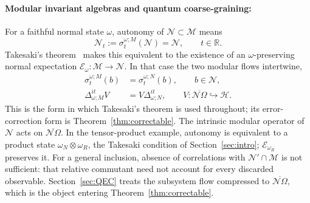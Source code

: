 \documentclass[a4paper,11pt]{article}
\theoremstyle{definition}
\newcommand{\nn}{\nonumber}
\newcommand{\mE}{\mathcal{E}}
\begin{document}
\paragraph{Modular invariant algebras and quantum coarse-graining:}
For a faithful normal state $\omega$, autonomy of $\mathcal N\subset\mathcal M$ means
\begin{equation}\label{eq:quantum-coarse-autonomy}
 \mathcal N_t:=\sigma^{\omega;M}_t(\mathcal N)=\mathcal N,\qquad t\in\mathbb R.
\end{equation}
Takesaki's theorem~\cite{Takesaki1972} makes this equivalent to the existence of
an $\omega$-preserving normal expectation $\mE_\omega:\mathcal M\to\mathcal N$. In that case the two modular flows intertwine,
\begin{align}
 \sigma^{\omega;M}_t(b)&=\sigma^{\omega;N}_t(b),\qquad b\in\mathcal N,\nn\\
 \Delta_{\omega;M}^{it}V&=V\Delta_{\omega;N}^{it},
 \qquad V:\overline{\mathcal N\Omega}\hookrightarrow\mathcal H.
 \label{eq:takesaki-intertwining}
\end{align}
This is the form in which Takesaki's theorem is used throughout; its error-correction form is Theorem~\ref{thm:correctable}.
The intrinsic modular operator of $\mathcal N$ acts on $\overline{\mathcal N\Omega}$.
In the tensor-product example, autonomy is equivalent to a product state
$\omega_N\otimes\omega_R$, the Takesaki condition of Section~\ref{sec:intro}; $\mE_{\omega_R}$ preserves it.
For a general inclusion, absence of correlations with $\mathcal N'\cap\mathcal M$ is not sufficient:
that relative commutant need not account for every discarded observable.
Section~\ref{sec:QEC} treats the subsystem flow compressed to
$\overline{\mathcal N\Omega}$, which is the object entering Theorem~\ref{thm:correctable}.

\end{document}
